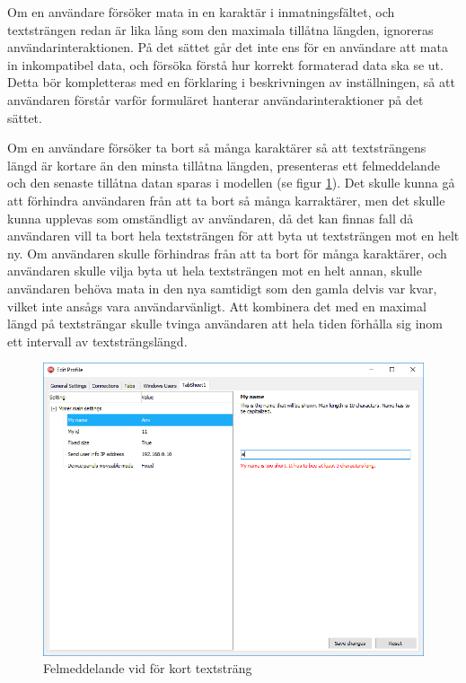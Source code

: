 Om en användare försöker mata in en karaktär i inmatningsfältet, och textsträngen redan är lika lång som den maximala tillåtna längden, ignoreras användarinteraktionen. På det sättet går det inte ens för en användare att mata in inkompatibel data, och försöka förstå hur korrekt formaterad data ska se ut. Detta bör kompletteras med en förklaring i beskrivningen av inställningen, så att användaren förstår varför formuläret hanterar användarinteraktioner på det sättet.

Om en användare försöker ta bort så många karaktärer så att textsträngens längd är kortare än den minsta tillåtna längden, presenteras ett felmeddelande och den senaste tillåtna datan sparas i modellen (se figur \ref{fig:textstrang-minLength}). Det skulle kunna gå att förhindra användaren från att ta bort så många karraktärer, men det skulle kunna upplevas som omständligt av användaren, då det kan finnas fall då användaren vill ta bort hela textsträngen för att byta ut textsträngen mot en helt ny. Om användaren skulle förhindras från att ta bort för många karaktärer, och användaren skulle vilja byta ut hela textsträngen mot en helt annan, skulle användaren behöva mata in den nya samtidigt som den gamla delvis var kvar, vilket inte ansågs vara användarvänligt. Att kombinera det med en maximal längd på textsträngar skulle tvinga användaren att hela tiden förhålla sig inom ett intervall av textsträngslängd.

\begin{figure}
	\includegraphics[width=\textwidth]{./images/gui/textstrang-minLength.png}
	\vspace{-1.7em}
	\caption{Felmeddelande vid för kort textsträng}
	\label{fig:textstrang-minLength}
\end{figure}

